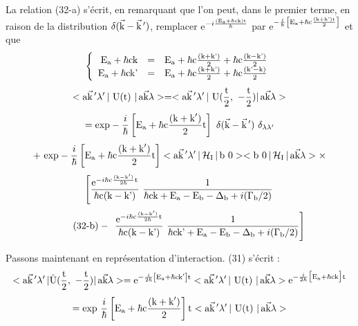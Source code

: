 La relation (32-a) s'écrit, en remarquant que l'on peut, dans le premier
terme, en raison de la distribution $\delta(\vec{\text{k}}-\vec{\text{k}}\,')$, remplacer
e$^{-i\frac{(\text{E}_{\text{a}}+\hbar\text{ck)t}}{\hbar}}$ par
e$^{-\frac{i}{\hbar}\left[\text{E}_{\text{a}}+\hbar\text{c}\frac{(\text{k}+\text{k')t}}{2}\right]}$ et que
\[
\left\{ \begin{array}{rcl}
\text{E}_{\text{a}}+\hbar\text{ck} & = & \text{E}_{\text{a}}+\hbar\text{c}\frac{(\text{k}+\text{k')}}{2}
+\hbar\text{c}\frac{(\text{k}-\text{k')}}{2} \\
\text{E}_{\text{a}}+\hbar\text{ck'} & = & \text{E}_{\text{a}}+\hbar\text{c}\frac{(\text{k}+\text{k')}}{2}
+\hbar\text{c}\frac{(\text{k'}-\text{k)}}{2} \end{array} \right.
\]
\[
<\mt{a}\vec{\mt{k}}\,'\lambda'\,|\mt{ U(t) }|\,\mt{a}\vec{\mt{k}}\lambda>=
<\mt{a}\vec{\mt{k}}\,'\lambda'\,|\mt{ U}(\frac{\mt{t}}{2},\ -\frac{\mt{t}}{2}) |\,\mt{a}\vec{\mt{k}}\lambda>
\]
\[
=\mt{exp}-\frac{i}{\hbar}\left[\mt{E}_\mt{a}+\hbar\mt{c}\frac{\mt{(k}+\mt{k}')}{2}\mt{t}\right]
\ \delta(\vec{\mt{k}}-\vec{\mt{k}}\,')\ \delta_{\lambda\lambda'}
\]
\[
+\text{ exp}-\frac{i}{\hbar}\left[\text{E}_{\text{a}}+\hbar\text{c}\frac{\text{(k}+\text{k}')}{2}\text{t}\right]
<\text{a}\vec{\text{k}}\,'\lambda'\,|\,\mathcal{H}_{\text{I}}\,|\,\text{b }0>
<\text{b }0\,|\,\mathcal{H}_{\text{I}}\,|\,\text{a}\vec{\text{k}}\lambda>\times
\]
\[
\left[
\frac{\mt{e}^{-i\hbar\mt{c}\frac{\mt{(k}-\mt{k}')}{2\hbar}\mt{t}}}{\hbar\mt{c(k}-\mt{k')}}
\ \frac{1}{\hbar\mt{ck}+\mt{E}_\mt{a}-\mt{E}_\mt{b}-\Delta_\mt{b}+i(\Gamma_\mt{b}/2)}
\right .
\]
\[
\tag{32-b}-\ \left.
\frac{\mt{e}^{-i\hbar\mt{c}\frac{\mt{(k}-\mt{k}')}{2\hbar}\mt{t}}}{\hbar\mt{c(k}-\mt{k')}}
\ \frac{1}{\hbar\mt{ck'}+\mt{E}_\mt{a}-\mt{E}_\mt{b}-\Delta_\mt{b}+i(\Gamma_\mt{b}/2)}
\right]
\]

Passons maintenant en représentation d'interaction. (31) s'écrit :
\[
<\mt{a}\vec{\mt{k}}\,'\lambda'\,|\tilde{\mt{U}}(\frac{\mt{t}}{2},\ -\frac{\mt{t}}{2})|\,\mt{a}\vec{\mt{k}}\lambda>=
\mt{e}^{-\frac{i}{2\hbar}\left[\mt{E}_\mt{a}+\hbar\mt{ck}'\right]\mt{t}}
<\mt{a}\vec{\mt{k}}\,'\lambda'\,|\mt{ U}(\mt{t) }|\,\mt{a}\vec{\mt{k}}\lambda>
\mt{e}^{-\frac{i}{2\hbar}\big[\mt{E}_\mt{a}+\hbar\mt{ck}\big]\mt{t}}
\]
\[
=\text{exp }\frac{i}{\hbar}\left[\text{E}_{\text{a}}+\hbar\text{c}\frac{\text{(k}+\text{k}')}{2}\right]\text{t}
<\text{a}\vec{\text{k}}\,'\lambda'\,|\text{ U}(\text{t) }|\,\text{a}\vec{\text{k}}\lambda>
\]

